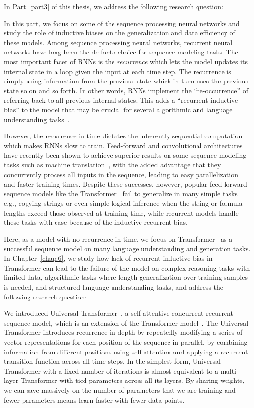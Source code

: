 In Part~\ref{part3} of this thesis, we address the following research question:

In this part, we focus on some of the sequence processing neural networks and study the role of inductive biases on the generalization and data efficiency of these models. 
Among sequence processing neural networks, recurrent neural networks have long been the de facto choice for sequence modeling tasks. The most important facet of RNNs is the \emph{recurrence} which lets the model updates its internal state in a loop given the input at each time step. The recurrence is simply using information from the previous state which in turn uses the previous state so on and so forth.  In other words, RNNs implement the ``re-occurrence'' of referring back to all previous internal states. This adds a ``recurrent inductive bias'' to the model that may be crucial for several algorithmic and language understanding tasks~\cite{tran2016recurrent,Dehghani:ICLR:2019}.

However, the recurrence in time dictates the inherently sequential computation which makes RNNs slow to train. Feed-forward and convolutional architectures have recently been shown to achieve superior results on some sequence modeling tasks such as machine translation~\citep{vaswani2017attention, NalBytenet2017}, with the added advantage that they concurrently process all inputs in the sequence, leading to easy parallelization and faster training times. Despite these successes, however, popular feed-forward sequence models like the Transformer~\citep{vaswani2017attention} fail to generalize in many simple tasks e.g., copying strings or even simple logical inference when the string or formula lengths exceed those observed at training time, while recurrent models handle these tasks with ease because of the inductive recurrent bias.

Here, as a model with no recurrence in time, we focus on Transformer~\citep{vaswani2017attention} as a successful sequence model on many language understanding and generation tasks. In Chapter~\ref{chap:6}, we study how lack of recurrent inductive bias in Transformer can lead to the failure of the model on complex reasoning tasks with limited data, algorithmic tasks where length generalization over training samples is needed, and structured language understanding tasks, and address the following research question:

We introduced Universal Transformer~\citep{Dehghani:ICLR:2019}, a self-attentive concurrent-recurrent sequence model, which is an extension of the Transformer model~\citep{vaswani2017attention}. The Universal Transformer introduces recurrence in depth by repeatedly modifying a series of vector representations for each position of the sequence in parallel, by combining information from different positions using self-attention and applying a recurrent transition function across all time steps. 
In the simplest form, Universal Transformer with a fixed number of iterations is almost equivalent to a multi-layer Transformer with tied parameters across all its layers. By sharing weights, we can save massively on the number of parameters that we are training and fewer parameters means learn faster with fewer data points. 

